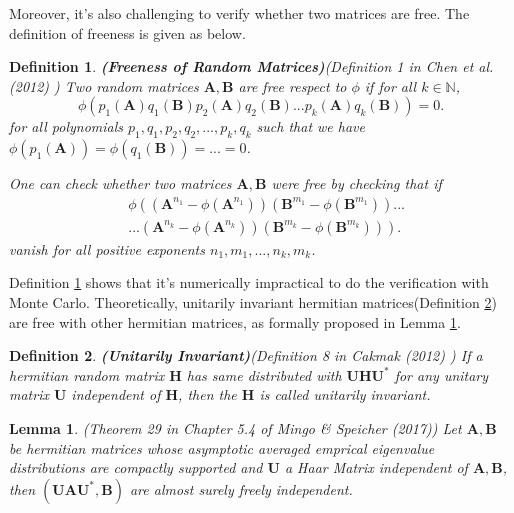 \documentclass[10pt,journal,compsoc]{IEEEtran}
\newtheorem{lemma}[theorem]{Lemma}
\newtheorem{definition}{Definition}[section]
\begin{document}
Moreover, it's also challenging to verify whether two matrices are free. The definition of freeness is given as below.
\begin{definition}
\textbf{(Freeness of Random Matrices)}(Definition 1 in Chen et al. (2012) \cite{chen2012partial}) Two random matrices $\mathbf{A}, \mathbf{B}$ are free respect to $\phi$ if for all $k\in \mathbb{N}$,
\begin{equation}
    \phi(p_1(\mathbf{A})q_1(\mathbf{B})p_2(\mathbf{A})q_2(\mathbf{B})...p_k(\mathbf{A})q_k(\mathbf{B})) = 0.
\end{equation}
for all polynomials $p_1,q_1,p_2,q_2,...,p_k,q_k$ such that we have $\phi(p_1(\mathbf{A}))=\phi(q_1(\mathbf{B}))=...=0$.

One can check whether two matrices $\mathbf{A},\mathbf{B}$ were free by checking that if 
\begin{equation}
\begin{split}
    & \phi\left(\left(\mathbf{A}^{n_1}-\phi(\mathbf{A}^{n_1})\right)\left(\mathbf{B}^{m_1}-\phi(\mathbf{B}^{m_1})\right)...\right.\\
    & \left....\left(\mathbf{A}^{n_k}-\phi(\mathbf{A}^{n_k})\right)\left(\mathbf{B}^{m_k}-\phi(\mathbf{B}^{m_k})\right)\right).
\end{split}
\end{equation}
vanish for all positive exponents $n_1,m_1,...,n_k,m_k$.
\label{def:freeness}
\end{definition}

Definition \ref{def:freeness} shows that it's numerically impractical to do the verification with Monte Carlo. Theoretically, unitarily invariant hermitian matrices(Definition \ref{def:unitarily_invariant}) are free with other hermitian matrices\cite{mingo2017free}, as formally proposed in Lemma \ref{lemma:unitary_invariant-free}.

\begin{definition}
\textbf{(Unitarily Invariant)}(Definition 8 in Cakmak (2012) \cite{cakmak2012non}) If a hermitian random matrix $\mathbf{H}$ has same distributed with $\mathbf{UHU}^*$ for any unitary matrix $\mathbf{U}$ independent of $\mathbf{H}$, then the $\mathbf{H}$ is called unitarily invariant.
\label{def:unitarily_invariant}
\end{definition}

\begin{lemma}
(Theorem 29 in Chapter 5.4 of Mingo \& Speicher (2017)\cite{mingo2017free}) Let $\mathbf{A},\mathbf{B}$ be hermitian matrices whose asymptotic averaged emprical eigenvalue distributions are compactly supported and $\mathbf{U}$ a Haar Matrix independent of $\mathbf{A},\mathbf{B}$, then $(\mathbf{UAU}^*,\mathbf{B})$ are almost surely freely independent.
\label{lemma:unitary_invariant-free}
\end{lemma}
\end{document}
